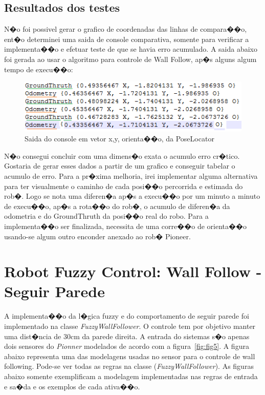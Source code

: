 \documentclass[twoside,conference,a4paper]{IEEEtran}
\begin{document}
\subsection{Resultados dos testes}

N�o foi possivel gerar o grafico de coordenadas das linhas de compara��o, ent�o determinei uma saida de console comparativa, somente para verificar a implementa��o e efetuar teste de que se havia erro acumulado.
A saida abaixo foi gerada ao usar o algoritmo para controle de Wall Follow, ap�s alguns algum tempo de execu��o:

\begin{figure}[ht]
\centering
\includegraphics[width=1\hsize]{images/console-1.png}
\caption{Saida do console em vetor x,y, orienta��o, da PoseLocator}
\label{fig:fig3}
\end{figure}

N�o consegui concluir com uma dimens�o exata o acumulo erro cr�tico. Gostaria de gerar esses dados a partir de um grafico e conseguir tabelar o acumulo de erro. Para a pr�xima melhoria, irei implementar alguma alternativa para ter visualmente o caminho de cada posi��o percorrida e estimada do rob�.
Logo se nota uma diferen�a ap�s a execu��o por um minuto a minuto de execu��o, ap�s a rota��o do rob�, o acumulo de diferen�a da odometria e do GroundThruth da posi��o real do robo. Para a implementa��o ser finalizada, necessita de uma corre��o de orienta��o usando-se algum outro enconder anexado ao rob� Pioneer.


\section{Robot Fuzzy Control: Wall Follow - Seguir Parede}
A implementa��o da l�gica fuzzy e do comportamento de seguir parede foi implementado na classe \textit{FuzzyWallFollower}. O controle tem por objetivo manter uma dist�ncia de 30cm da parede direita. A entrada do sistemas s�o apenas dois sensores do \textit{Pionner} modelados de acordo com a figura~\ref{fig:fig5}. A figura abaixo representa uma das modelagens usadas no sensor para o controle de wall following.
Pode-se ver todas as regras na classe (\textit{FuzzyWallFollower}). As figuras abaixo somente exemplificam a modelagem implementadas nas regras de entrada e sa�da e os exemplos de cada ativa��o.
\end{document}
